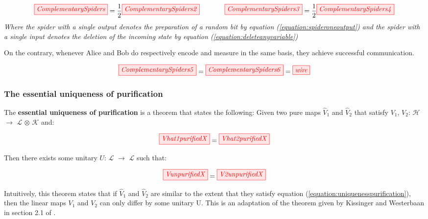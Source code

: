 \documentclass[]{article}
\begin{document}
\begin{equation}
	\label{equation:Complementarity}
	\tikzfig{ComplementarySpiders} = \frac{1}{2} \tikzfig{ComplementarySpiders2} ~~~~~~~~~~~ \tikzfig{ComplementarySpiders3} = \frac{1}{2} \tikzfig{ComplementarySpiders4} 
\end{equation}
\textit{Where the spider with a single output denotes the preparation of a random bit by equation (\ref{equation:spideroneoutput}) and the spider with a single input denotes the deletion of the incoming state by equation (\ref{equation:deleteanyvariable})}

On the contrary, whenever Alice and Bob do respectively encode and measure in the same basis, they achieve successful communication.

\begin{equation}
	\label{equation:ComplementarityPositive}
	\tikzfig{ComplementarySpiders5} = \tikzfig{ComplementarySpiders6} = \tikzfig{wire}
\end{equation}

\subsubsection{The essential uniqueness of purification}
\label{section:essentialuniqueness}

The \textbf{essential uniqueness of purification} is a theorem that states the following: Given two pure maps $\hat{V}_1$ and $\hat{V}_2$ that satisfy $V_1$, $V_2$: $\mathcal{H}$ $\rightarrow$ $\mathcal{L}$ $\otimes$ $\mathcal{K}$ and:

\begin{equation}
	\label{equation:uniquenesspurification}
	\tikzfig{Vhat1purifiedX} = \tikzfig{Vhat2purifiedX}
\end{equation}

Then there exists some unitary $U$: $\mathcal{L}$ $\rightarrow$ $\mathcal{L}$ such that:

\begin{equation}
	\tikzfig{VunpurifiedX} = \tikzfig{V2unpurifiedX}
\end{equation}

Intuitively, this theorem states that if $\hat{V}_1$ and $\hat{V}_2$ are similar to the extent that they satisfy equation (\ref{equation:uniquenesspurification}), then the linear maps $V_1$ and $V_2$ can only differ by some unitary U. This is an adaptation of the theorem given by Kissinger and Westerbaan in section 2.1 of \cite{Kissinger2017}.
\end{document}
